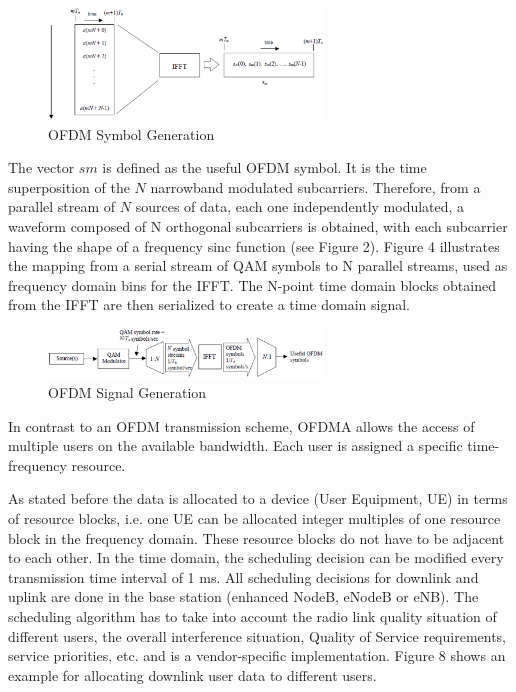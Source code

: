 \begin{figure}[htbp]
    \centering
    \includegraphics[width=0.65\textwidth]{./figures/ofdm_symbol_gen}
    \caption{ OFDM Symbol Generation
    \label{fig:ofdmsymbol}}
\end{figure}

The vector $sm$ is defined as the useful OFDM symbol. It is the time superposition
of the $N$ narrowband modulated subcarriers. Therefore, from a parallel stream
of $N$ sources of data, each one independently modulated, a waveform composed of
N orthogonal subcarriers is obtained, with each subcarrier having the shape of a
frequency sinc function (see Figure 2). Figure 4 illustrates the mapping from a
serial stream of QAM symbols to N parallel streams, used as frequency domain bins
for the IFFT. The N-point time domain blocks obtained from the IFFT are then
serialized to create a time domain signal.

\begin{figure}[htbp]
    \centering
    \includegraphics[width=0.65\textwidth]{./figures/ofdm_signal_chain}
    \caption{ OFDM Signal Generation
    \label{fig:ofdmchain}}
\end{figure}

In contrast to an OFDM transmission scheme, OFDMA allows the access of multiple
users on the available bandwidth. Each user is assigned a specific time-frequency
resource.

As stated before the data is allocated to a device (User Equipment, UE) in terms
of resource blocks, i.e. one UE can be allocated integer multiples of one resource
block in the frequency domain. These resource blocks do not have to be adjacent to
each other. In the time domain, the scheduling decision can be modified every
transmission time interval of 1 ms. All scheduling decisions for downlink and
uplink are done in the base station (enhanced NodeB, eNodeB or eNB). The scheduling
algorithm has to take into account the radio link quality situation of different
users, the overall interference situation, Quality of Service requirements, service
priorities, etc. and is a vendor-specific implementation. Figure 8 shows an example
for allocating downlink user data to different users.\\

